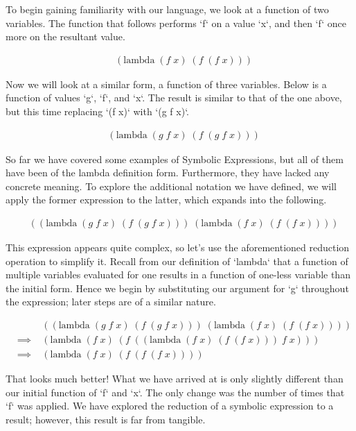To begin gaining familiarity with our language, we look at a function of two
variables. The function that follows performs `f` on a value `x`, and then `f`
once more on the resultant value.

\begin{align*}
& (\text{lambda} \; (f \; x) \; (f \; (f \; x)))
\end{align*}

Now we will look at a similar form, a function of three variables. Below is a
function of values `g`, `f`, and `x`. The result is similar to that of the one
above, but this time replacing `(f x)` with `(g f x)`.

\begin{align*}
& (\text{lambda} \; (g \; f \; x) \; (f \; (g \; f \; x)))
\end{align*}

So far we have covered some examples of Symbolic Expressions, but all of them have 
been of the lambda definition form. Furthermore, they have lacked any concrete
meaning. To explore the additional notation we have defined, we will apply the
former expression to the latter, which expands into the following.

\begin{align*}
& ((\text{lambda} \; (g \; f \; x) \; (f \; (g \; f \; x))) \; (\text{lambda} \; (f \; x) \; (f \; (f \; x))))
\end{align*}

This expression appears quite complex, so let's use the aforementioned reduction 
operation to simplify it. Recall from our definition of `lambda` that a function
of multiple variables evaluated for one results in a function of one-less variable 
than the initial form. Hence we begin by substituting our argument for `g`
throughout the expression; later steps are of a similar nature.

\begin{align*}
& &((\text{lambda} \; (g \; f \; x) \; (f \; (g \; f \; x))) \; (\text{lambda} \; (f \; x) \; (f \; (f \; x))))
\\& \implies \; &(\text{lambda} \; (f \; x) \; (f \; ((\text{lambda} \; (f \; x) \; (f \; (f \; x))) \; f \; x)))
\\& \implies \; &(\text{lambda} \; (f \; x) \; (f \; (f \; (f \; x))))
\end{align*}

That looks much better! What we have arrived at is only slightly different than
our initial function of `f` and `x`. The only change was the number of times that
`f` was applied. We have explored the reduction of a symbolic expression to a
result; however, this result is far from tangible.

